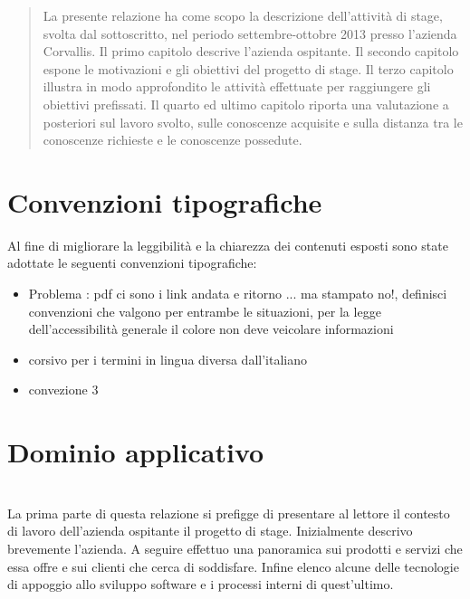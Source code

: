 \newcommand{\Versione}{1.0}%
\newcommand{\Data}{2013-01-21}%




\null\vspace{2.0in}
\begin{abstract}
La presente relazione ha come scopo la descrizione dell'attività di stage, svolta dal sottoscritto, nel periodo settembre-ottobre 2013 presso l'azienda Corvallis. Il primo capitolo descrive l'azienda ospitante. Il secondo capitolo espone le motivazioni e gli obiettivi del progetto di stage. Il terzo capitolo illustra in modo approfondito le attività effettuate per raggiungere gli obiettivi prefissati. Il quarto ed ultimo capitolo riporta una valutazione a posteriori sul lavoro svolto, sulle conoscenze acquisite e sulla distanza tra le conoscenze richieste e le conoscenze possedute.
\end{abstract}
\vspace{\fill}
%
\newpage
\section*{Convenzioni tipografiche}
Al fine di migliorare la leggibilità e la chiarezza dei contenuti esposti sono state adottate le seguenti convenzioni tipografiche:
\begin{itemize}
\item Problema : pdf ci sono i link andata e ritorno ... ma stampato no!, definisci convenzioni che valgono per entrambe le situazioni, per la legge dell'accessibilità generale il colore non deve veicolare informazioni
\item corsivo per i termini in lingua diversa dall'italiano
\item convezione 3
\end{itemize}

\newpage
\tableofcontents

\newpage

\listoftables
\listoffigures

\newpage

\section{Dominio applicativo}\\
\label{1.0}
La prima parte di questa relazione si prefigge di presentare al lettore il contesto di lavoro dell'azienda ospitante il progetto di stage. Inizialmente descrivo brevemente l'azienda. A seguire effettuo una panoramica sui prodotti e servizi che essa offre e sui clienti che cerca di soddisfare. Infine elenco alcune delle tecnologie di appoggio allo sviluppo software e i processi interni di quest'ultimo.

